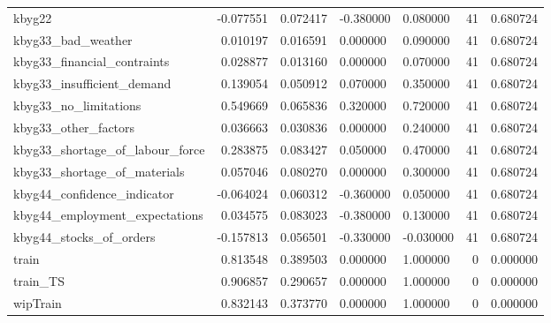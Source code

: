 \begin{landscape}
\begin{longtable}[h!]{lrrllrr}
kbyg22 & -0.077551 & 0.072417 & -0.380000 & 0.080000 & 41 & 0.680724 \\
kbyg33_bad_weather & 0.010197 & 0.016591 & 0.000000 & 0.090000 & 41 & 0.680724 \\
kbyg33_financial_contraints & 0.028877 & 0.013160 & 0.000000 & 0.070000 & 41 & 0.680724 \\
kbyg33_insufficient_demand & 0.139054 & 0.050912 & 0.070000 & 0.350000 & 41 & 0.680724 \\
kbyg33_no_limitations & 0.549669 & 0.065836 & 0.320000 & 0.720000 & 41 & 0.680724 \\
kbyg33_other_factors & 0.036663 & 0.030836 & 0.000000 & 0.240000 & 41 & 0.680724 \\
kbyg33_shortage_of_labour_force & 0.283875 & 0.083427 & 0.050000 & 0.470000 & 41 & 0.680724 \\
kbyg33_shortage_of_materials & 0.057046 & 0.080270 & 0.000000 & 0.300000 & 41 & 0.680724 \\
kbyg44_confidence_indicator & -0.064024 & 0.060312 & -0.360000 & 0.050000 & 41 & 0.680724 \\
kbyg44_employment_expectations & 0.034575 & 0.083023 & -0.380000 & 0.130000 & 41 & 0.680724 \\
kbyg44_stocks_of_orders & -0.157813 & 0.056501 & -0.330000 & -0.030000 & 41 & 0.680724 \\
train & 0.813548 & 0.389503 & 0.000000 & 1.000000 & 0 & 0.000000 \\
train_TS & 0.906857 & 0.290657 & 0.000000 & 1.000000 & 0 & 0.000000 \\
wipTrain & 0.832143 & 0.373770 & 0.000000 & 1.000000 & 0 & 0.000000 \\
\end{longtable}\end{landscape}
